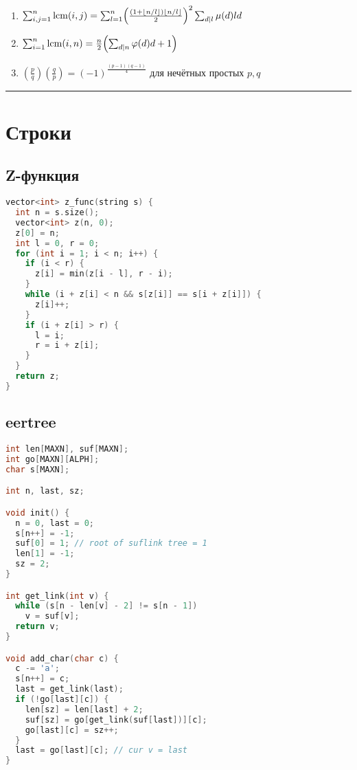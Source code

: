 \documentclass[9pt,a4paper,landscape,twosided]{extarticle}
\begin{document}
\begin{multicols*}{3}
\begin{enumerate}
\item %
$\sum_{i,j=1}^n\operatorname{lcm}(i,j)
=\sum_{l=1}^n\Bigl(\frac{(1+\lfloor n/l\rfloor)\lfloor n/l\rfloor}{2}\Bigr)^2\sum_{d\mid l}\mu(d)ld$

\item %
$\sum_{i=1}^n\operatorname{lcm}(i,n)=\frac{n}{2}\Bigl(\sum_{d\mid n}\varphi(d)d+1\Bigr)$

\item %
$\left(\tfrac{p}{q}\right)\left(\tfrac{q}{p}\right)=(-1)^{\frac{(p-1)(q-1)}{4}}$
 для нечётных простых $p,q$

\end{enumerate}

\endgroup


\noindent\rule{\linewidth}{0.15mm}

\section{Строки}

\subsection{Z-функция}
\begin{lstlisting}[language=C++]
vector<int> z_func(string s) {
  int n = s.size();
  vector<int> z(n, 0);
  z[0] = n;
  int l = 0, r = 0;
  for (int i = 1; i < n; i++) {
    if (i < r) {
      z[i] = min(z[i - l], r - i);
    }
    while (i + z[i] < n && s[z[i]] == s[i + z[i]]) {
      z[i]++;
    }
    if (i + z[i] > r) {
      l = i;
      r = i + z[i];
    }
  }
  return z;
}
\end{lstlisting}

\subsection{eertree}
\begin{lstlisting}[language=C++]
int len[MAXN], suf[MAXN];
int go[MAXN][ALPH];
char s[MAXN];

int n, last, sz;

void init() {
  n = 0, last = 0;
  s[n++] = -1;
  suf[0] = 1; // root of suflink tree = 1
  len[1] = -1;
  sz = 2;
}

int get_link(int v) {
  while (s[n - len[v] - 2] != s[n - 1])
    v = suf[v];
  return v;
}

void add_char(char c) {
  c -= 'a';
  s[n++] = c;
  last = get_link(last);
  if (!go[last][c]) {
    len[sz] = len[last] + 2;
    suf[sz] = go[get_link(suf[last])][c];
    go[last][c] = sz++;
  }
  last = go[last][c]; // cur v = last
}
\end{lstlisting}


\end{multicols*}
\end{document}
